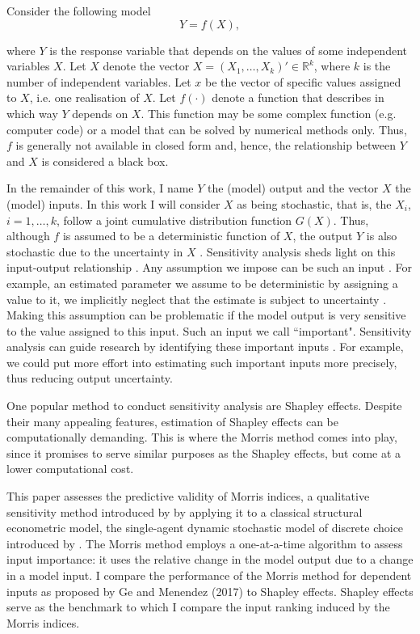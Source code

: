 
\noindent Consider the following model
\begin{equation*}
Y = f(X),
\end{equation*}

where $Y$ is the response variable that depends on the values of some independent variables $X$. Let $X$ denote the vector $X = (X_1, \dots, X_k)' \in \mathbb{R}^k$, where $k$ is the number of independent variables. Let $x$ be the vector of specific values assigned to $X$, i.e. one realisation of $X$. Let $f(\cdot)$ denote a function that describes in which way $Y$ depends on $X$. This function may be some complex function (e.g. computer code) or a model that can be solved by numerical methods only. Thus, $f$ is generally not available in closed form and, hence, the relationship between $Y$ and $X$ is considered a black box.

In the remainder of this work, I name $Y$ the (model) output and the vector $X$ the (model) inputs. In this work I will consider $X$ as being stochastic, that is, the $X_i$, $i = 1,\dots, k$, follow a joint cumulative distribution function $G(X)$. Thus, although $f$ is assumed to be a deterministic function of $X$, the output $Y$ is also stochastic due to the uncertainty in $X$ \citep{SNS16}. Sensitivity analysis sheds light on this input-output relationship \citep{BP16}.
Any assumption we impose can be such an input \citep{R21}. For example, an estimated parameter we assume to be deterministic by assigning a value to it, we implicitly neglect that the estimate is subject to uncertainty \citep{R21}. Making this assumption can be problematic if the model output is very sensitive to the value assigned to this input. Such an input we call ``important". Sensitivity analysis can guide research by identifying these important inputs \citep{R21}. For example, we could put more effort into estimating such important inputs more precisely, thus reducing output uncertainty.


One popular method to conduct sensitivity analysis are Shapley effects. Despite their many appealing features, estimation of Shapley effects can be computationally demanding. This is where the Morris method comes into play, since it promises to serve similar purposes as the Shapley effects, but come at a lower computational cost.


This paper assesses the predictive validity of Morris indices, a qualitative sensitivity method introduced by \citep{M91} by applying it to a classical structural econometric model, the single-agent dynamic stochastic model of discrete choice introduced by \citet{R87}. The Morris method employs a one-at-a-time algorithm to assess input importance: it uses the relative change in the model output due to a change in a model input. I compare the performance of the Morris method for dependent inputs as proposed by Ge and Menendez (2017) to Shapley effects. Shapley effects serve as the benchmark to which I compare the input ranking induced by the Morris indices.

